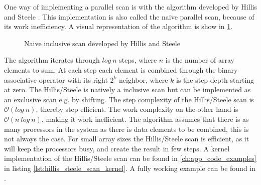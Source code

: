 One way of implementing a parallel scan is with the algorithm developed by Hillis and Steele \cite{Hillis:1986:DPA:7902.7903}. This implementation is also called the naive parallel scan, because of its work inefficiency. A visual representation of the algorithm is show in \cref{fig:scan_hillis_steele}. 

\begin{figure}[ht]
	\centering
	\caption{Naive inclusive scan developed by Hillis and Steele}
	\label{fig:scan_hillis_steele}
\end{figure}

The algorithm iterates through $log~n$ steps, where $n$ is the number of array elements to sum. At each step each element is combined through the binary associative operator with its right $ 2^k $ neighbor, where $k$ is the step depth starting at zero. The Hillis/Steele is natively a inclusive scan but can be implemented as an exclusive scan e.g. by shifting. The step complexity of the Hillis/Steele scan is $\mathcal{O}(log~n)$, thereby step efficient. The work complexity on the other hand is $\mathcal{O}(n~ log~n)$, making it work inefficient. The algorithm assumes that there is as many processors in the system as there is data elements to be combined, this is not always the case. For small array sizes the Hillis/Steele scan is efficient, as it will keep the processors busy, and create the result in few steps. A kernel implementation of the Hillis/Steele scan can be found in \cref{ch:app_code_examples} in listing \ref{lst:hillis_steele_scan_kernel}. A fully working example can be found in \cite{exercises}.
